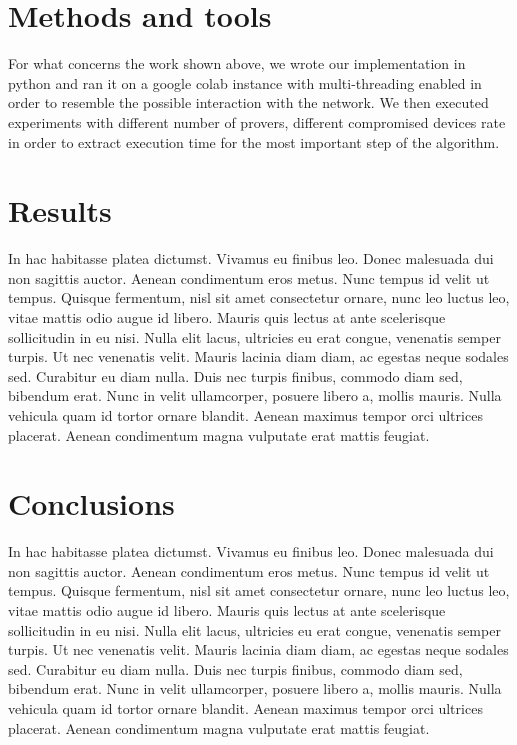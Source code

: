 \documentclass[10pt, a4paper, twocolumn]{article} %
\begin{document}
\section{Methods and tools}

For what concerns the work shown above, we wrote our implementation in python and ran it on a google colab instance with multi-threading enabled in order to resemble the possible interaction with the network.
We then executed experiments with different number of provers, different compromised devices rate in order to extract execution time for the most important step of the algorithm.
\section{Results}

In hac habitasse platea dictumst. Vivamus eu finibus leo. Donec malesuada dui non sagittis auctor. Aenean condimentum eros metus. Nunc tempus id velit ut tempus. Quisque fermentum, nisl sit amet consectetur ornare, nunc leo luctus leo, vitae mattis odio augue id libero. Mauris quis lectus at ante scelerisque sollicitudin in eu nisi. Nulla elit lacus, ultricies eu erat congue, venenatis semper turpis. Ut nec venenatis velit. Mauris lacinia diam diam, ac egestas neque sodales sed. Curabitur eu diam nulla. Duis nec turpis finibus, commodo diam sed, bibendum erat. Nunc in velit ullamcorper, posuere libero a, mollis mauris. Nulla vehicula quam id tortor ornare blandit. Aenean maximus tempor orci ultrices placerat. Aenean condimentum magna vulputate erat mattis feugiat.

\section{Conclusions}

In hac habitasse platea dictumst. Vivamus eu finibus leo. Donec malesuada dui non sagittis auctor. Aenean condimentum eros metus. Nunc tempus id velit ut tempus. Quisque fermentum, nisl sit amet consectetur ornare, nunc leo luctus leo, vitae mattis odio augue id libero. Mauris quis lectus at ante scelerisque sollicitudin in eu nisi. Nulla elit lacus, ultricies eu erat congue, venenatis semper turpis. Ut nec venenatis velit. Mauris lacinia diam diam, ac egestas neque sodales sed. Curabitur eu diam nulla. Duis nec turpis finibus, commodo diam sed, bibendum erat. Nunc in velit ullamcorper, posuere libero a, mollis mauris. Nulla vehicula quam id tortor ornare blandit. Aenean maximus tempor orci ultrices placerat. Aenean condimentum magna vulputate erat mattis feugiat.


\printbibliography[title={Bibliography}] %

\end{document}
